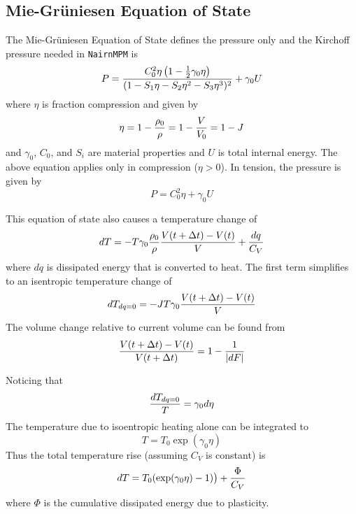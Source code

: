 \documentclass[11pt]{article}
\begin{document}
\subsection{Mie-Gr\"{u}niesen Equation of State}

The Mie-Gr\"{u}niesen Equation of State defines the pressure only and the Kirchoff pressure needed in {\tt NairnMPM} is
\begin{equation}
       P = {C_0^2 \eta \left(1 - {1\over 2}\gamma_0 \eta\right) \over (1 - S_1\eta - S_2\eta^2 - S_3 \eta^3)^2} + \gamma_0 U
\end{equation}
where $\eta$ is fraction compression and given by
\begin{equation}
    \eta = 1 - {\rho_0\over \rho} = 1 - {V\over V_0} = 1 - J
\end{equation}
and $\gamma_0$, $C_0$, and $S_i$ are material properties and $U$ is total internal energy. The above equation applies only in compression ($\eta>0$). In tension, the pressure is given by
\begin{equation}
      P = C_0^2\eta + \gamma_0 U
\end{equation}

This equation of state also causes a temperature change of
\begin{equation}
     dT = - T \gamma_0 {\rho_0\over \rho} {V(t+\Delta t)-V(t)\over V} + {dq \over C_V}
\end{equation}
where $dq$ is dissipated energy that is converted to heat. The first term simplifies to an isentropic temperature change of
\begin{equation}
     dT_{dq=0} = - JT \gamma_0  {V(t+\Delta t)-V(t)\over V} 
\end{equation}
The volume change relative to current volume can be found from
\begin{equation}
     {V(t+\Delta t)-V(t)\over V(t+\Delta t)} =1 - {1\over |dF|}
\end{equation}

Noticing that
\begin{equation}
     {dT_{dq=0}\over T} =   \gamma_0  d\eta
\end{equation}
The temperature due to isoentropic heating alone can be integrated to
\begin{equation}
     T = T_0\exp( \gamma_0  \eta)
\end{equation}
Thus the total temperature rise (assuming $C_V$ is constant) is
\begin{equation}
      dT = T_0(\exp( \gamma_0  \eta)-1)\bigr) + {\Phi\over C_V}
\end{equation}
where $\Phi$ is the cumulative dissipated energy due to plasticity.
\end{document}
